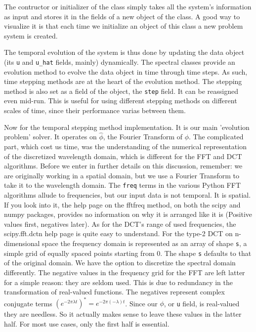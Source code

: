 \documentclass[a4paper]{article}
\begin{document}
The contructor or initializer of the class simply takes all the system's information as input and stores it in the fields of a new object of the class.
A good way to visualize it is that each time we initialize an object of this class a new problem system is created.

The temporal evolution of the system is thus done by updating the data object (its \verb`u` and \verb`u_hat` fields, mainly) dynamically.
The spectral classes provide an evolution method to evolve the data object in time through time steps.
As such, time stepping methods are at the heart of the evolution method.
The stepping method is also set as a field of the object, the \verb`step` field.
It can be reassigned even mid-run.
This is useful for using different stepping methods on different scales of time, since their performance varias between them.


Now for the temporal stepping method implementation.
It is our main 'evolution problem' solver.
It operates on $\hat{\phi}$, the Fourier Transform of $\phi$.
The complicated part, which cost us time,
was the understanding of the numerical representation of the discretized wavelength domain,
which is different for the FFT and DCT algorithms.
Before we enter in further details on this discussion, remember:
we are originally working in a spatial domain,
but we use a Fourier Transform to take it to the wavelength domain.
The \verb`freq` terms in the various Python FFT algorithms allude to frequencies, but our input data is not temporal.
It is spatial.
If you look into it, the help page on the fftfreq method,
on both the scipy and numpy packages,
provides no information on why it is arranged like it is (Positive values first, negatives later).
As for the DCT's range of used frequencies, the scipy.fft.dctn help page is quite easy to understand.
For the type-2 DCT on n-dimensional space the frequency domain is represented as an array of shape \verb`s`,
a simple grid of equally spaced points starting from 0.
The shape \verb`s` defaults to that of the original domain.
We have the option to discretize the spectral domain differently.
The negative values in the frequency grid for the FFT are left latter for a simple reason: they are seldom used.
This is due to redundancy in the transformation of real-valued functions.
The negatives represent complex conjugate terms
$(e^{-2 \pi \lambda t})^* = e^{-2 \pi (-\lambda) t}$.
Since our $\phi$, or \verb`u` field, is real-valued they are needless.
So it actually makes sense to leave these values in the latter half.
For most use cases, only the first half is essential.
\end{document}
